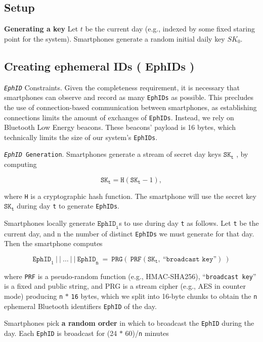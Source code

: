 \documentclass[10.8pt,a4paper]{article}
\begin{document}
\subsection{Setup}

\textbf{Generating a key} Let $t$ be the current day (e.g., indexed by some fixed staring point for the system). 
Smartphones generate a random initial daily key $SK_0$. 


\subsection{Creating ephemeral IDs ( EphIDs )}


\texttt{\textit{EphID}} Constraints. Given the completeness requirement, it is necessary that smartphones can observe and record as many \texttt{EphIDs} as possible. This precludes the use of connection-based communication between smartphones, as establishing connections limits the amount of exchanges of \texttt{EphIDs}. Instead, we rely on Bluetooth Low Energy beacons. These beacons’ payload is 16 bytes, which technically limits the size of our system’s \texttt{EphIDs}.

\texttt{\textit{EphID} Generation}. Smartphones generate a stream of secret day keys $\texttt{SK}_\texttt{t}$ , by computing

\[\texttt{SK}_\texttt{t}  = \texttt{H}(\texttt{SK}_\texttt{t} - 1) ,\]

where \texttt{H} is a cryptographic hash function. The smartphone will use the secret key $\texttt{SK}_\texttt{t}$ during day \texttt{t}  to generate \texttt{EphIDs}.

Smartphones locally generate $\texttt{EphID}_\texttt{i}$s to use during day \texttt{t} as follows. Let \texttt{t} be the current day, and n the number of distinct \texttt{EphIDs} we must generate for that day. Then the smartphone computes

\[\texttt{EphID}_1\  \vert\ \vert\ \ldots\ \vert\ \vert\ \texttt{EphID}_\texttt{n}\ =\ \texttt{PRG} (\ \texttt{PRF}(\texttt{SK}_\texttt{t} ,\ “\texttt{broadcast key}”)\ )\]


where \texttt{PRF} is a pseudo-random function (e.g., HMAC-SHA256), “\texttt{broadcast key}” is a fixed and public string, and PRG is a stream cipher (e.g., AES in counter mode) producing \texttt{n} $\ast$ \texttt{16} bytes, which we split into 16-byte chunks to obtain the \texttt{n} ephemeral Bluetooth identifiers \texttt{EphID} of the day.

Smartphones pick \textbf{a random order} in which to broadcast the \texttt{EphID} during the day. Each \texttt{EphID} is broadcast for (24 $\ast$ 60)/\texttt{n}  minutes
\end{document}
